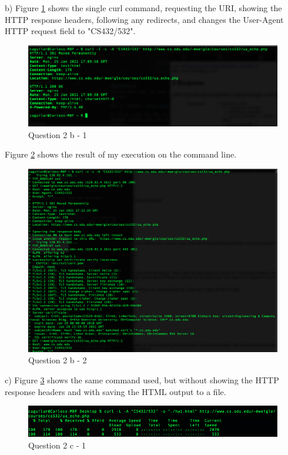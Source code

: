 \documentclass[12pt]{article}
\begin{document}
b) Figure \ref{fig:qb1} shows the single curl command, requesting the URI, showing the HTTP response headers, following any redirects, and changes the User-Agent HTTP request field to "CS432/532". 

\begin{figure}[h!]
    \centering
    \includegraphics[clip, width=\textwidth] {b1}
    \caption{Question 2 b - 1}
    \label{fig:qb1}
\end{figure}

Figure \ref{fig:qb2} shows the result of my execution on the command line.

\begin{figure}[h!]
    \centering
    \includegraphics[clip, width=\textwidth] {b2}
    \caption{Question 2 b - 2}
    \label{fig:qb2}
\end{figure}


c) Figure \ref{fig:qc1} shows the same command used, but without showing the HTTP response headers and with saving the HTML output to a file.

\begin{figure}[h!]
    \centering
    \includegraphics[clip, width=\textwidth] {c1}
    \caption{Question 2 c - 1}
    \label{fig:qc1}
\end{figure}
\end{document}
